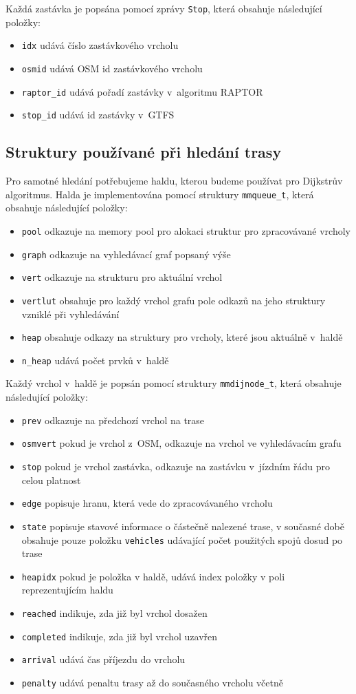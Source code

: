 Každá zastávka je popsána pomocí zprávy {\tt Stop}, která obsahuje následující
položky:
\begin{itemize}
	\item {\tt idx} udává číslo zastávkového vrcholu
	\item {\tt osmid} udává OSM id zastávkového vrcholu 
	\item {\tt raptor\_id} udává pořadí zastávky v~algoritmu RAPTOR
	\item {\tt stop\_id} udává id zastávky v~GTFS
\end{itemize} 

\subsection{Struktury používané při hledání trasy}
Pro samotné hledání potřebujeme haldu, kterou budeme používat pro Dijkstrův
algoritmus. Halda je implementována pomocí struktury {\tt mmqueue\_t}, která
obsahuje následující položky:
\begin{itemize}
	\item {\tt pool} odkazuje na memory pool pro alokaci struktur pro
		zpracovávané vrcholy 
	\item {\tt graph} odkazuje na vyhledávací graf popsaný výše
	\item {\tt vert} odkazuje na strukturu pro aktuální vrchol 
	\item {\tt vertlut} obsahuje pro každý vrchol grafu pole odkazů na
	jeho struktury vzniklé při vyhledávání
	\item {\tt heap} obsahuje odkazy na struktury pro vrcholy, které jsou
		aktuálně v~haldě
	\item {\tt n\_heap} udává počet prvků v~haldě
\end{itemize}
Každý vrchol v~haldě je popsán pomocí struktury {\tt mmdijnode\_t}, která
obsahuje následující položky:
\begin{itemize}
	\item {\tt prev} odkazuje na předchozí vrchol na trase
	\item {\tt osmvert} pokud je vrchol z~OSM, odkazuje na vrchol ve
	vyhledávacím grafu 
	\item {\tt stop} pokud je vrchol zastávka, odkazuje na zastávku
v~jízdním řádu pro celou platnost
	\item {\tt edge} popisuje hranu, která vede do zpracovávaného vrcholu 
	\item {\tt state} popisuje stavové informace o částečně nalezené trase,
	v současné době obsahuje pouze položku {\tt vehicles} udávající počet
	použitých spojů dosud po trase
	\item {\tt heapidx} pokud je položka v haldě, udává index položky v poli
	reprezentujícím haldu
	\item {\tt reached} indikuje, zda již byl vrchol dosažen
	\item {\tt completed} indikuje, zda již byl vrchol uzavřen
	\item {\tt arrival} udává čas příjezdu do vrcholu
	\item {\tt penalty} udává penaltu trasy až do současného vrcholu včetně
\end{itemize}

